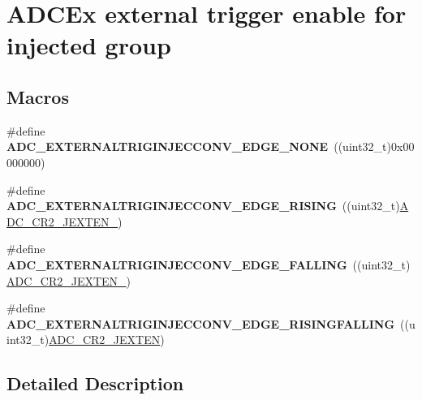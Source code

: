 \hypertarget{group___a_d_c_ex___external__trigger__edge___injected}{\section{A\-D\-C\-Ex external trigger enable for injected group}
\label{group___a_d_c_ex___external__trigger__edge___injected}
}
\subsection*{Macros}
\begin{DoxyCompactItemize}
\item 
\hypertarget{group___a_d_c_ex___external__trigger__edge___injected_ga5ef4af64eb11cd75fac665eb7dce016b}{\#define {\bfseries A\-D\-C\-\_\-\-E\-X\-T\-E\-R\-N\-A\-L\-T\-R\-I\-G\-I\-N\-J\-E\-C\-C\-O\-N\-V\-\_\-\-E\-D\-G\-E\-\_\-\-N\-O\-N\-E}~((uint32\-\_\-t)0x00000000)}\label{group___a_d_c_ex___external__trigger__edge___injected_ga5ef4af64eb11cd75fac665eb7dce016b}

\item 
\hypertarget{group___a_d_c_ex___external__trigger__edge___injected_ga79010c28c68ef0c2a19c021adcf983d2}{\#define {\bfseries A\-D\-C\-\_\-\-E\-X\-T\-E\-R\-N\-A\-L\-T\-R\-I\-G\-I\-N\-J\-E\-C\-C\-O\-N\-V\-\_\-\-E\-D\-G\-E\-\_\-\-R\-I\-S\-I\-N\-G}~((uint32\-\_\-t)\hyperlink{group___peripheral___registers___bits___definition_ga0b3c99510de210ff3137ff8de328889b}{A\-D\-C\-\_\-\-C\-R2\-\_\-\-J\-E\-X\-T\-E\-N\-\_})}\label{group___a_d_c_ex___external__trigger__edge___injected_ga79010c28c68ef0c2a19c021adcf983d2}

\item 
\hypertarget{group___a_d_c_ex___external__trigger__edge___injected_ga34a788461ea897390ea0854808a0a326}{\#define {\bfseries A\-D\-C\-\_\-\-E\-X\-T\-E\-R\-N\-A\-L\-T\-R\-I\-G\-I\-N\-J\-E\-C\-C\-O\-N\-V\-\_\-\-E\-D\-G\-E\-\_\-\-F\-A\-L\-L\-I\-N\-G}~((uint32\-\_\-t)\hyperlink{group___peripheral___registers___bits___definition_ga949c70fdf36a32a6afcbf44fec123832}{A\-D\-C\-\_\-\-C\-R2\-\_\-\-J\-E\-X\-T\-E\-N\-\_})}\label{group___a_d_c_ex___external__trigger__edge___injected_ga34a788461ea897390ea0854808a0a326}

\item 
\hypertarget{group___a_d_c_ex___external__trigger__edge___injected_gad9982de1061b65924dd62873e95fd803}{\#define {\bfseries A\-D\-C\-\_\-\-E\-X\-T\-E\-R\-N\-A\-L\-T\-R\-I\-G\-I\-N\-J\-E\-C\-C\-O\-N\-V\-\_\-\-E\-D\-G\-E\-\_\-\-R\-I\-S\-I\-N\-G\-F\-A\-L\-L\-I\-N\-G}~((uint32\-\_\-t)\hyperlink{group___peripheral___registers___bits___definition_ga07330f702208792faca3a563dc4fd9c6}{A\-D\-C\-\_\-\-C\-R2\-\_\-\-J\-E\-X\-T\-E\-N})}\label{group___a_d_c_ex___external__trigger__edge___injected_gad9982de1061b65924dd62873e95fd803}

\end{DoxyCompactItemize}


\subsection{Detailed Description}
